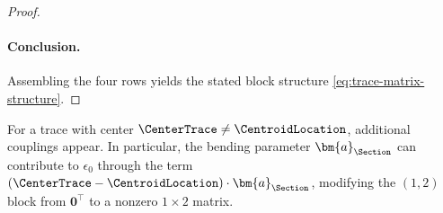 \begin{Old}
\begin{proof}
\paragraph{Conclusion.}
Assembling the four rows yields the stated block structure \eqref{eq:trace-matrix-structure}.
\end{proof}
\end{Old}

\begin{remark}
For a trace with center $\CenterTrace \neq \CentroidLocation$, 
additional couplings appear. In particular, the bending parameter $\bm{a}_{\Section}$ 
can contribute to $\epsilon_{0}$ through the term 
$(\CenterTrace - \CentroidLocation) \cdot \bm{a}_{\Section}$, 
modifying the $(1,2)$ block from $\mathbf{0}^\top$ to a nonzero $1 \times 2$ matrix.
\end{remark}

